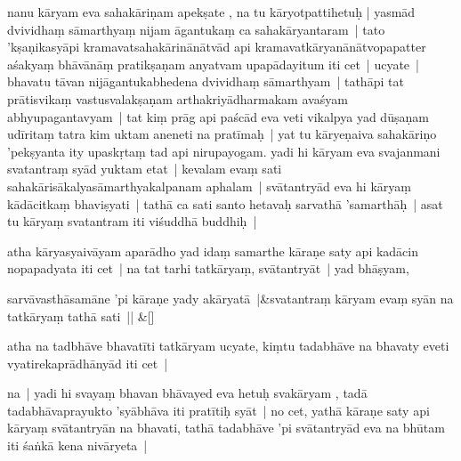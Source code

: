 \documentclass[article,12pt,a4paper]{memoir}%
\newcounter{parCount}
\begin{document}
	  \pstart \leavevmode%
	\label{thakur75-76.6}nanu kāryam eva sahakāriṇam apekṣate , na tu kāryotpattihetuḥ | yasmād dvividhaṃ sāmarthyaṃ nijam āgantukaṃ ca sahakāryantaram | tato 'kṣaṇikasyāpi kramavatsahakārinānātvād api kramavatkāryanānātvopapatter aśakyaṃ bhāvānāṃ pratikṣaṇam anyatvam upapādayitum iti cet |\label{thakur75-76.9} ucyate | bhavatu tāvan nijāgantukabhedena dvividhaṃ sāmarthyam | tathāpi tat prātisvikaṃ vastusvalakṣaṇam arthakriyādharmakam avaśyam abhyupagantavyam | tat kiṃ prāg api paścād eva veti vikalpya yad dūṣaṇam udīritaṃ tatra kim uktam aneneti na pratīmaḥ | \label{thakur75-76.12} yat tu kāryeṇaiva sahakāriṇo 'pekṣyanta ity upaskṛtaṃ tad api nirupayogam. yadi hi kāryam eva svajanmani svatantraṃ syād yuktam etat | kevalam evaṃ sati sahakārisākalyasāmarthyakalpanam aphalam | svātantryād eva hi kāryaṃ kādācitkaṃ bhaviṣyati | tathā ca sati santo hetavaḥ sarvathā 'samarthāḥ | asat tu kāryaṃ svatantram iti viśuddhā buddhiḥ |
	{}
	\pend%
      

	  \pstart \leavevmode%
	\label{thakur75-76.17}atha kāryasyaivāyam aparādho yad idaṃ samarthe kāraṇe saty api kadācin nopapadyata iti cet | na tat tarhi tatkāryaṃ, svātantryāt |\label{thakur75-76.18} yad bhāṣyam,
	{}
	\pend%
      
	    
	    \stanza[\smallbreak]
	  sarvāvasthāsamāne 'pi kāraṇe yady akāryatā |&svatantraṃ kāryam evaṃ syān na tatkāryaṃ tathā sati || \&[\smallbreak]
	  
	  
	  

	  \pstart \leavevmode%
	\label{thakur75-76.21}atha na tadbhāve bhavatīti tatkāryam ucyate, kiṃtu tadabhāve na bhavaty eveti vyatirekaprādhānyād iti cet |
	{}
	\pend%
      

	  \pstart \leavevmode%
	\label{thakur75-76.22}na | yadi hi svayaṃ bhavan bhāvayed eva hetuḥ svakāryam , tadā tadabhāvaprayukto 'syābhāva iti pratītiḥ syāt | no cet, yathā kāraṇe saty api kāryaṃ svātantryān na bhavati, tathā tadabhāve 'pi svātantryād eva na bhūtam iti śaṅkā kena nivāryeta |
	{}
	\pend%
      
\end{document}
